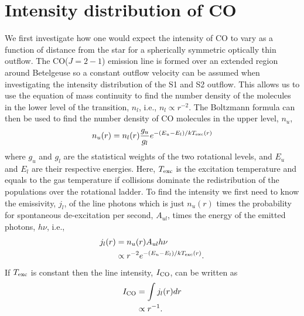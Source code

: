 \section{Intensity distribution of CO}\label{sec:5.7}
We first investigate how one would expect the intensity of CO to vary as a function of distance from the star for a spherically symmetric optically thin outflow. The CO($J=2-1$) emission line is formed over an extended region around Betelgeuse so a constant outflow velocity can be assumed when investigating the intensity distribution of the S1 and S2 outflow. This allows us to use the equation of mass continuity to find the number density of the molecules in the lower level of the transition, $n_{l}$, i.e., $n_{l} \propto r^{-2}$. The Boltzmann formula can then be used to find the number density of CO molecules in the upper level, $n_{u}$, 
\begin{equation}
n_{u}(r)=n_{l}(r)\frac{g_{u}}{g_{l}}e^{-(E_u-E_l)/kT_{\rm{exc}}(r)}
\end{equation}
where $g_{u}$ and $g_{l}$ are the statistical weights of the two rotational levels, and $E_u$ and $E_{l}$ are their respective energies. Here, $T_{\rm{exc}}$ is the excitation temperature and equals to the gas temperature if collisions dominate the redistribution of the populations over the rotational ladder. To find the intensity we first need to know the emissivity, $j_{l}$, of the line photons which is just $n_{u}(r)$ times the probability for spontaneous de-excitation per second, $A_{ul}$, times the energy of the emitted photons, $h\nu$, i.e.,
\begin{align}
j_{l}(r)     & =  n_{u}(r)A_{ul}h\nu \nonumber \\
 &\propto r^{-2}e^{-(E_u-E_l)/kT_{\rm{exc}}(r)}.
\end{align}
If $T_{\rm{exc}}$ is constant then the line intensity, $I_{\rm{CO}}$, can be written as
\begin{align}
I_{\rm{CO}} & = \int j_{l}(r) dr  \nonumber \\
 &\propto r^{-1}.
\end{align}

